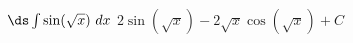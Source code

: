 {$\ds \int \sin(\sqrt{x})\ dx$}
{$2 \sin \left(\sqrt{x}\right)-2 \sqrt{x} \cos \left(\sqrt{x}\right)+C$
}

